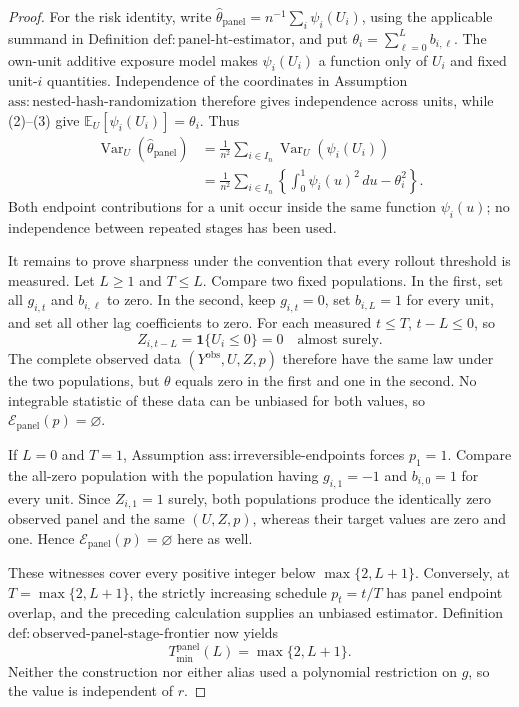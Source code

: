 \documentclass{article}
\begin{document}
\begin{proof}
For the risk identity, write \(\widehat\theta_{\mathrm{panel}}=n^{-1}\sum_i\psi_i(U_i)\), using the applicable summand in Definition \(\mathrm{def:panel\text{-}ht\text{-}estimator}\), and put \(\theta_i=\sum_{\ell=0}^{L}b_{i,\ell}\).  The own-unit additive exposure model makes \(\psi_i(U_i)\) a function only of \(U_i\) and fixed unit-\(i\) quantities.  Independence of the coordinates in Assumption \(\mathrm{ass:nested\text{-}hash\text{-}randomization}\) therefore gives independence across units, while (2)--(3) give \(\mathbb E_U[\psi_i(U_i)]=\theta_i\).  Thus
\[
\begin{aligned}
 \operatorname{Var}_U(\widehat\theta_{\mathrm{panel}})
 &=\frac1{n^2}\sum_{i\in I_n}\operatorname{Var}_U(\psi_i(U_i))\\
 &=\frac1{n^2}\sum_{i\in I_n}
 \left\{\int_0^1\psi_i(u)^2\,du-\theta_i^2\right\}.
\end{aligned}
\]
Both endpoint contributions for a unit occur inside the same function \(\psi_i(u)\); no independence between repeated stages has been used.

It remains to prove sharpness under the convention that every rollout threshold is measured.  Let \(L\geq1\) and \(T\leq L\).  Compare two fixed populations.  In the first, set all \(g_{i,t}\) and \(b_{i,\ell}\) to zero.  In the second, keep \(g_{i,t}=0\), set \(b_{i,L}=1\) for every unit, and set all other lag coefficients to zero.  For each measured \(t\leq T\), \(t-L\leq0\), so
\[
 Z_{i,t-L}=\mathbf 1\{U_i\leq0\}=0
 \quad\text{almost surely}.
\]
The complete observed data \((Y^{\mathrm{obs}},U,Z,p)\) therefore have the same law under the two populations, but \(\theta\) equals zero in the first and one in the second.  No integrable statistic of these data can be unbiased for both values, so \(\mathcal E_{\mathrm{panel}}(p)=\varnothing\).

If \(L=0\) and \(T=1\), Assumption \(\mathrm{ass:irreversible\text{-}endpoints}\) forces \(p_1=1\).  Compare the all-zero population with the population having \(g_{i,1}=-1\) and \(b_{i,0}=1\) for every unit.  Since \(Z_{i,1}=1\) surely, both populations produce the identically zero observed panel and the same \((U,Z,p)\), whereas their target values are zero and one.  Hence \(\mathcal E_{\mathrm{panel}}(p)=\varnothing\) here as well.

These witnesses cover every positive integer below \(\max\{2,L+1\}\).  Conversely, at \(T=\max\{2,L+1\}\), the strictly increasing schedule \(p_t=t/T\) has panel endpoint overlap, and the preceding calculation supplies an unbiased estimator.  Definition \(\mathrm{def:observed\text{-}panel\text{-}stage\text{-}frontier}\) now yields
\[
 T_{\min}^{\mathrm{panel}}(L)=\max\{2,L+1\}.
\]
Neither the construction nor either alias used a polynomial restriction on \(g\), so the value is independent of \(r\).
\end{proof}
\end{document}
